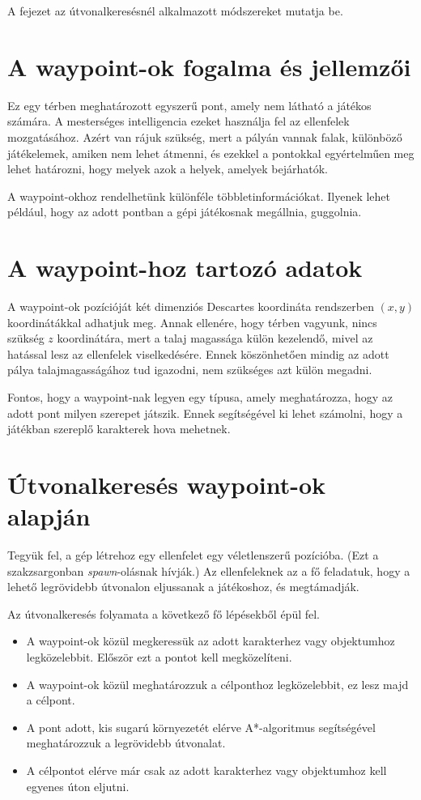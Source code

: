 \label{Chap:utvonalkereses}

A fejezet az útvonalkeresésnél alkalmazott módszereket mutatja be.

\section{A waypoint-ok fogalma és jellemzői}

Ez egy térben meghatározott egyszerű pont, amely nem látható a játékos számára. A mesterséges intelligencia ezeket használja fel az ellenfelek mozgatásához. Azért van rájuk szükség, mert a pályán vannak falak, különböző játékelemek, amiken nem lehet átmenni, és ezekkel a pontokkal egyértelműen meg lehet határozni, hogy melyek azok a helyek, amelyek bejárhatók.

A waypoint-okhoz rendelhetünk különféle többletinformációkat. Ilyenek lehet például, hogy az adott pontban a gépi játékosnak megállnia, guggolnia.

\section{A waypoint-hoz tartozó adatok}

A waypoint-ok pozícióját két dimenziós Descartes koordináta rendszerben $(x, y)$ koordinátákkal adhatjuk meg. Annak ellenére, hogy térben vagyunk, nincs szükség $z$ koordinátára, mert a talaj magassága külön kezelendő, mivel az hatással lesz az ellenfelek viselkedésére. Ennek köszönhetően mindig az adott pálya talajmagasságához tud igazodni, nem szükséges azt külön megadni.

Fontos, hogy a waypoint-nak legyen egy típusa, amely meghatározza, hogy az adott pont milyen szerepet játszik. Ennek segítségével ki lehet számolni, hogy a játékban szereplő karakterek hova mehetnek.

\section{Útvonalkeresés waypoint-ok alapján}

Tegyük fel, a gép létrehoz egy ellenfelet egy véletlenszerű pozícióba. (Ezt a szakzsargonban \textit{spawn}-olásnak hívják.) Az ellenfeleknek az a fő feladatuk, hogy a lehető legrövidebb útvonalon eljussanak a játékoshoz, és megtámadják. 

Az útvonalkeresés folyamata a következő fő lépésekből épül fel.
\begin{itemize}
\item A waypoint-ok közül megkeressük az adott karakterhez vagy objektumhoz legközelebbit. Először ezt a pontot kell megközelíteni.
\item A waypoint-ok közül meghatározzuk a célponthoz legközelebbit, ez lesz majd a célpont.
\item A pont adott, kis sugarú környezetét elérve A*-algoritmus segítségével meghatározzuk a legrövidebb útvonalat.
\item A célpontot elérve már csak az adott karakterhez vagy objektumhoz kell egyenes úton eljutni.
\end{itemize}

